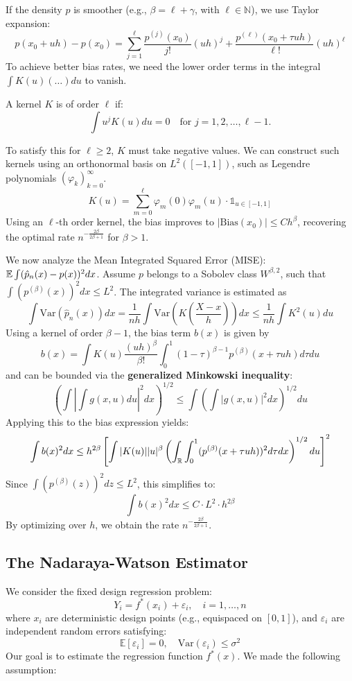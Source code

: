 If the density $p$ is smoother (e.g., $\beta = \ell + \gamma$, with $\ell \in \mathbb{N}$), we use Taylor expansion:
\[
p(x_0 + uh) - p(x_0) = \sum_{j=1}^{\ell} \frac{p^{(j)}(x_0)}{j!} (uh)^j + \frac{p^{(\ell)}(x_0 + \tau uh)}{\ell!} (uh)^\ell
\]
To achieve better bias rates, we need the lower order terms in the integral $\int K(u) (\dots) du$ to vanish.

\begin{de}
    A kernel $K$ is of order $\ell$ if:
\[
\int u^j K(u) du = 0 \quad \text{for } j=1, 2, \dots, \ell-1.
\]
\end{de}
\begin{remark}
    To satisfy this for $\ell \ge 2$, $K$ must take negative values. We can construct such kernels using an orthonormal basis on $L^2([-1, 1])$, such as Legendre polynomials $(\varphi_k)_{k=0}^\infty$.
\[
K(u) = \sum_{m=0}^\ell \varphi_m(0)\varphi_m(u) \cdot \mathbb{1}_{u \in [-1, 1]}
\]
Using an $\ell$-th order kernel, the bias improves to $|\text{Bias}(x_0)| \le C h^\beta$, recovering the optimal rate $n^{-\frac{2\beta}{2\beta+1}}$ for $\beta > 1$.
\end{remark}

We now analyze the Mean Integrated Squared Error (MISE): $\mathbb{E} \int (\hat p_n(x) - p(x))^2 dx$. Assume $p$ belongs to a Sobolev class $W^{\beta, 2}$, such that $\int (p^{(\beta)}(x))^2 dx \le L^2$. The integrated variance is estimated as
\[
\int \text{Var}(\hat p_n(x)) dx = \frac{1}{nh} \int \text{Var}\left( K\left( \frac{X-x}{h} \right) \right) dx \le \frac{1}{nh} \int K^2(u) du
\]
Using a kernel of order $\beta-1$, the bias term $b(x)$ is given by
\[
b(x) = \int K(u) \frac{(uh)^\beta}{\beta!} \int_0^1 (1-\tau)^{\beta-1} p^{(\beta)}(x + \tau uh) d\tau du
\]
and can be bounded via the \textbf{generalized Minkowski inequality}:
\[
\left( \int \left| \int g(x, u) du \right|^2 dx \right)^{1/2} \le \int \left( \int |g(x, u)|^2 dx \right)^{1/2} du
\]
Applying this to the bias expression yields:
\[
\int b(x)^2 dx \le h^{2\beta} \left[ \int |K(u)| |u|^\beta \left( \int_{\mathbb{R}} \int_0^1 (p^{(\beta)}(x+\tau uh))^2 d\tau dx \right)^{1/2} du \right]^2
\]
Since $\int (p^{(\beta)}(z))^2 dz \le L^2$, this simplifies to:
\[
\int b(x)^2 dx \le C \cdot L^2 \cdot h^{2\beta}
\]
By optimizing over $h$, we obtain the rate $n^{-\frac{2\beta}{2\beta+1}}$.

\subsection{The Nadaraya-Watson Estimator}
We consider the fixed design regression problem:
$$ Y_i = f^*(x_i) + \varepsilon_i, \quad i=1, \dots, n $$
where $x_i$ are deterministic design points (e.g., equispaced on $[0,1]$), and $\varepsilon_i$ are independent random errors satisfying:
$$ \mathbb{E}[\varepsilon_i] = 0, \quad \text{Var}(\varepsilon_i) \le \sigma^2 $$
Our goal is to estimate the regression function $f^*(x)$. We made the following assumption:

